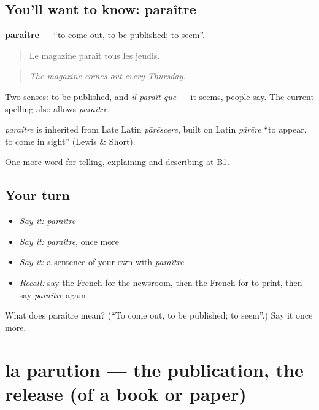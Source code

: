 \subsection*{You'll want to know: paraître}
\textbf{paraître} — \textquotedblleft{}to come out, to be published; to seem\textquotedblright{}.

\begin{quote}
Le magazine paraît tous les jeudis.
\end{quote}

\begin{quote}
\emph{The magazine comes out every Thursday.}
\end{quote}

Two senses: to be published, and \emph{il paraît que} — it seems, people say. The current spelling also allows \emph{paraitre}.

\begin{cousinweb}
\emph{paraître} is inherited from Late Latin \emph{pārēscere}, built on Latin \emph{pārēre} \textquotedblleft{}to appear, to come in sight\textquotedblright{} (Lewis \& Short).
\end{cousinweb}

\begin{grammarlens}[title={What you've built}]
One more word for telling, explaining and describing at B1.
\end{grammarlens}

\subsection*{Your turn}
\begin{itemize}
\raggedright
  \item \emph{Say it:} \emph{paraître}
  \item \emph{Say it:} \emph{paraître}, once more
  \item \emph{Say it:} a sentence of your own with \emph{paraître}
  \item \emph{Recall:} say the French for the newsroom, then the French for to print, then say \emph{paraître} again
\end{itemize}

\begin{tcolorbox}[breakable,colback=teal!4,colframe=teal!35!black,title={Before you move on}]
What does paraître mean? (\textquotedblleft{}To come out, to be published; to seem\textquotedblright{}.) Say it once more.
\end{tcolorbox}
\section[la parution]{la parution — the publication, the release (of a book or paper)}

